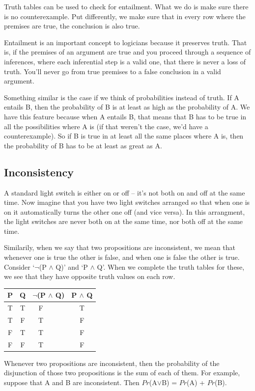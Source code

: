 \documentclass[]{tufte-book}
\begin{document}
Truth tables can be used to check for entailment. What we do is make sure there is no counterexample. Put differently, we make sure that in every row where the premises are true, the conclusion is also true.

Entailment is an important concept to logicians because it preserves truth. That is, if the premises of an argument are true and you proceed through a sequence of inferences, where each inferential step is a valid one, that there is never a loss of truth. You'll never go from true premises to a false conclusion in a valid argument.

Something similar is the case if we think of probabilities instead of truth. If A entails B, then the probability of B is at least as high as the probability of A. We have this feature because when A entails B, that means that B has to be true in all the possibilities where A is (if that weren't the case, we'd have a counterexample). So if B is true in at least all the same places where A is, then the probability of B has to be at least as great as A.

\hypertarget{inconsistency}{%
\subsection{Inconsistency}\label{inconsistency}}

A standard light switch is either on or off -- it's not both on and off at the same time. Now imagine that you have two light switches arranged so that when one is on it automatically turns the other one off (and vice versa). In this arrangment, the light switches are never both on at the same time, nor both off at the same time.

Similarily, when we say that two propositions are inconsistent, we mean that whenever one is true the other is false, and when one is false the other is true. Consider `\(\neg\)(P \(\wedge\) Q)' and `P \(\wedge\) Q'. When we complete the truth tables for these, we see that they have opposite truth values on each row.

\begin{longtable}[]{@{}cccc@{}}
\toprule
P & Q & \(\neg\)(P \(\wedge\) Q) & P \(\wedge\) Q\tabularnewline
\midrule
\endhead
T & T & F\(~~~~~~~~~~\) & T\tabularnewline
T & F & T\(~~~~~~~~~~\) & F\tabularnewline
F & T & T\(~~~~~~~~~~\) & F\tabularnewline
F & F & T\(~~~~~~~~~~\) & F\tabularnewline
\bottomrule
\end{longtable}

Whenever two propositions are inconsistent, then the probability of the disjunction of those two propositions is the sum of each of them. For example, suppose that A and B are inconsistent. Then \(Pr\)(A\(\vee\)B) = \(Pr\)(A) + \(Pr\)(B).
\end{document}
